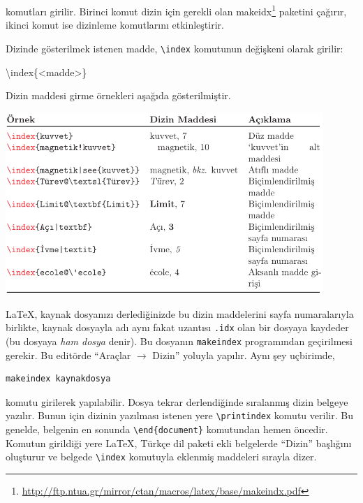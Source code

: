 \documentclass[
  10pt,
]{scrbook}
\newenvironment{Shaded}{\begin{snugshade}}{\end{snugshade}}
\newcommand{\FunctionTok}[1]{\textcolor[rgb]{0.00,0.00,0.00}{#1}}
\newcommand{\NormalTok}[1]{#1}
\renewcommand{\href}[2]{#2\footnote{\url{#1}}}
\theoremstyle{definition}
\theoremstyle{definition}
\theoremstyle{definition}
\theoremstyle{definition}
\theoremstyle{remark}
\begin{document}
komutları girilir. Birinci komut dizin için gerekli olan \href{http://ftp.ntua.gr/mirror/ctan/macros/latex/base/makeindx.pdf}{makeidx} paketini çağırır, ikinci komut ise dizinleme komutlarını etkinleştirir.

Dizinde gösterilmek istenen madde, \texttt{\textbackslash{}index} komutunun değişkeni olarak girilir:

\begin{Shaded}
\begin{Highlighting}[]
\FunctionTok{\textbackslash{}index}\NormalTok{\{\textless{}madde\textgreater{}\}}
\end{Highlighting}
\end{Shaded}

Dizin maddesi girme örnekleri aşağıda gösterilmiştir.

\includegraphics[width=0.9\textwidth,height=\textheight]{images/dizina.png}

LaTeX, kaynak dosyanızı derlediğinizde bu dizin maddelerini sayfa numaralarıyla birlikte, kaynak dosyayla adı aynı fakat uzantısı \texttt{.idx} olan bir dosyaya kaydeder (bu dosyaya \emph{ham dosya} denir). Bu dosyanın \texttt{makeindex} programından geçirilmesi gerekir. Bu editörde ``Araçlar \(\rightarrow\) Dizin'' yoluyla yapılır. Aynı şey uçbirimde,

\begin{verbatim}
makeindex kaynakdosya
\end{verbatim}

komutu girilerek yapılabilir. Dosya tekrar derlendiğinde sıralanmış dizin belgeye yazılır. Bunun için dizinin yazılması istenen yere \texttt{\textbackslash{}printindex} komutu verilir. Bu genelde, belgenin en sonunda \texttt{\textbackslash{}end\{document\}} komutundan hemen öncedir. Komutun girildiği yere LaTeX, Türkçe dil paketi ekli belgelerde ``Dizin'' başlığını oluşturur ve belgede \texttt{\textbackslash{}index} komutuyla eklenmiş maddeleri sırayla dizer.
\end{document}
